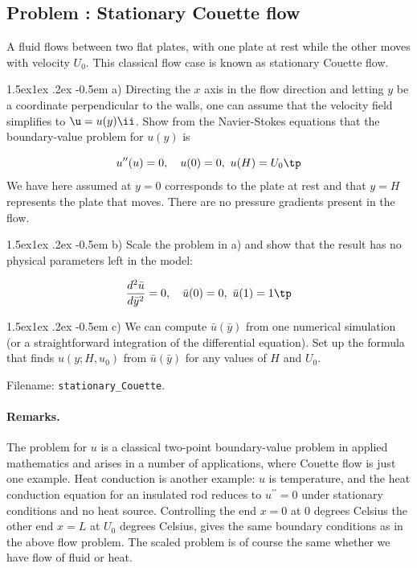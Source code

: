 \documentclass[graybox,envcountchap,sectrefs,final]{svmonodo}
\makeatletter
\newenvironment{doconceexercise}{}{}
\newcounter{doconceexercisecounter}
\newcommand\subex{\@startsection{paragraph}{4}{\z@}%
                  {1.5ex\@plus1ex \@minus.2ex}%
                  {-0.5em}%
                  {\normalfont\normalsize\bfseries}}
\makeatother
\begin{document}
\begin{doconceexercise}

\subsection*{Problem \thedoconceexercisecounter: Stationary Couette flow}

\label{scale:vib:exer:stationary_Couette}

A fluid flows between two flat plates, with one plate at rest while
the other moves with velocity $U_0$. This classical flow case is known as
stationary Couette flow.


\subex{a)}
Directing the $x$ axis in the flow direction and letting $y$ be
a coordinate perpendicular to the walls, one can assume that
the velocity field simplifies to $\u = u(y)\ii$.
Show from the Navier-Stokes equations that the boundary-value problem
for $u(y)$ is

\[ u^{\prime\prime}(u) = 0,\quad u(0)=0,\ u(H)=U_0\tp\]
We have here assumed at $y=0$ corresponds to the plate at rest and
that $y=H$ represents the plate that moves. There are no pressure
gradients present in the flow.

\subex{b)}
Scale the problem in a) and show that the result has no physical parameters
left in the model:

\[ \frac{d^2\bar u}{d\bar y^2} = 0,\quad \bar u(0)=0,\ \bar u(1)=1\tp\]

\subex{c)}
We can compute $\bar u(\bar y)$ from one numerical simulation (or a
straightforward integration of the differential equation). Set up
the formula that finds $u(y; H, u_0)$ from $\bar u(\bar y)$ for any
values of $H$ and $U_0$.


\noindent Filename: \Verb!stationary_Couette!.


\paragraph{Remarks.}
The problem for $u$ is a classical two-point boundary-value problem
in applied mathematics and arises in a number of applications, where
Couette flow is just one example. Heat conduction is another
example: $u$ is temperature, and the heat conduction equation for
an insulated rod reduces to $u^{\prime\prime}=0$ under stationary
conditions and no heat source.
Controlling the end $x=0$ at 0 degrees Celsius the other end $x=L$
at $U_0$ degrees
Celsius, gives the same boundary conditions as in the above flow problem.
The scaled problem is of course the same whether we have flow of
fluid or heat.


\end{doconceexercise}
\end{document}
